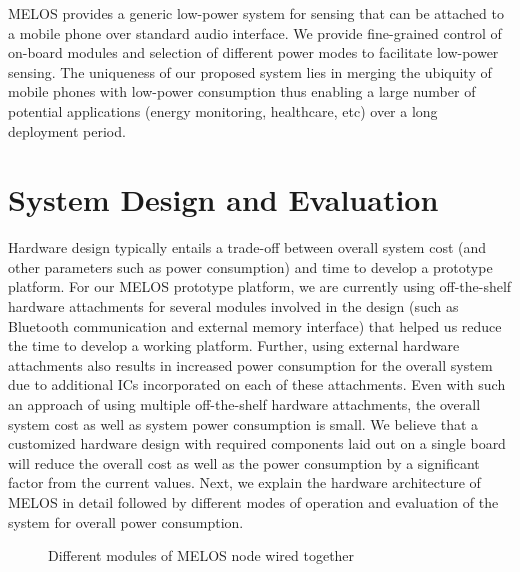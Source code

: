 \documentclass[10pt]{sigplan-proc-varsize}
\newcommand{\melos}{MELOS }
\begin{document}
\melos provides a generic low-power system for sensing that can be attached to a mobile phone over standard audio interface. We provide fine-grained control of on-board modules and selection of different power modes to facilitate low-power sensing. The uniqueness of our proposed system lies in merging the ubiquity of mobile phones with low-power consumption thus enabling a large number of potential applications (energy monitoring, healthcare, etc) over a long deployment period.

\section{System Design and Evaluation}
\label{sec:sysDes}
Hardware design typically entails a trade-off between overall system cost (and other parameters such as power consumption) and time to develop a prototype platform. For our \melos prototype platform, we are currently using off-the-shelf hardware attachments for several modules involved in the design (such as Bluetooth communication and external memory interface) that helped us reduce the time to develop a working platform. Further, using external hardware attachments also results in increased power consumption for the overall system due to additional ICs incorporated on each of these attachments. Even with such an approach of using multiple off-the-shelf hardware attachments, the overall system cost as well as system power consumption is small. We believe that a customized hardware design with required components laid out on a single board will reduce the overall cost as well as the power consumption by a significant factor from the current values. Next, we explain the hardware architecture of \melos in detail followed by different modes of operation and evaluation of the system for overall power consumption.

\begin{figure}
\centering
{}
\caption{Different modules of \melos node wired together}
\label{fig:meloscircuit}
\end{figure}
\end{document}
